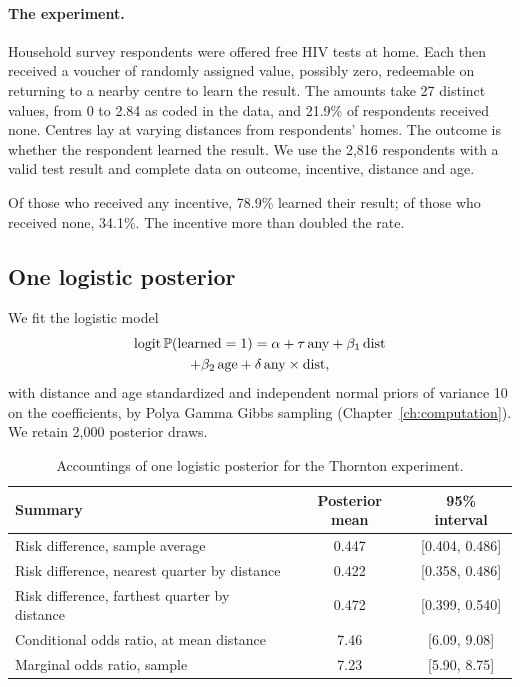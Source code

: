 \paragraph{The experiment.} Household survey respondents were offered free HIV tests at home. Each then received a voucher of randomly assigned value, possibly zero, redeemable on returning to a nearby centre to learn the result. The amounts take 27 distinct values, from 0 to 2.84 as coded in the data, and 21.9\% of respondents received none. Centres lay at varying distances from respondents' homes. The outcome is whether the respondent learned the result. We use the 2,816 respondents with a valid test result and complete data on outcome, incentive, distance and age.

Of those who received any incentive, 78.9\% learned their result; of those who received none, 34.1\%. The incentive more than doubled the rate.

\subsection{One logistic posterior}

We fit the logistic model
\begin{multline*}
\operatorname{logit}\mathbb{P}(\text{learned} = 1) = \alpha + \tau\,\mathrm{any} + \beta_1\,\mathrm{dist} \\
+ \beta_2\,\mathrm{age} + \delta\,\mathrm{any}\times\mathrm{dist},
\end{multline*}
with distance and age standardized and independent normal priors of variance 10 on the coefficients, by Polya Gamma Gibbs sampling (Chapter~\ref{ch:computation}). We retain 2,000 posterior draws.

\begin{table}[ht]
\centering
\caption{Accountings of one logistic posterior for the Thornton experiment.}
\label{tab:thornton}
\small
\begin{tabular}{p{2.1in}cc}
\toprule
Summary & Posterior mean & 95\% interval \\
\midrule
Risk difference, sample average & 0.447 & [0.404, 0.486] \\
Risk difference, nearest quarter by distance & 0.422 & [0.358, 0.486] \\
Risk difference, farthest quarter by distance & 0.472 & [0.399, 0.540] \\
Conditional odds ratio, at mean distance & 7.46 & [6.09, 9.08] \\
Marginal odds ratio, sample & 7.23 & [5.90, 8.75] \\
\bottomrule
\end{tabular}
\end{table}

